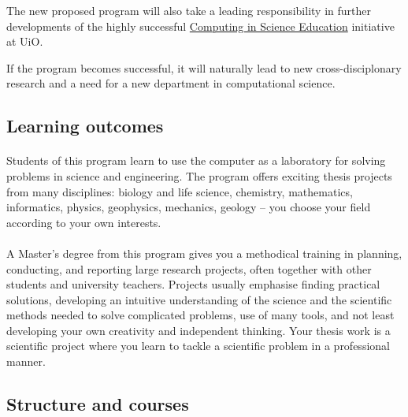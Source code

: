 \documentclass[%
twoside,                 %
final,                   %
10pt]{article}
\begin{document}
The new proposed program will also take a leading responsibility in further
developments of the highly successful \href{{http://www.mn.uio.no/english/about/collaboration/cse/}}{Computing in Science Education} initiative at UiO.

If the program becomes successful, it will naturally lead to
new cross-disciplonary research and a need for a new department
in computational science.




\subsection*{Learning outcomes}

\paragraph{}
Students of this program learn to use the computer as a laboratory for solving problems in science and engineering. The program offers exciting thesis projects from many disciplines: biology and life science, chemistry, mathematics, informatics, physics, geophysics, mechanics, geology  – you choose your  field according to your own interests.




\paragraph{}
A Master’s degree from this program gives you a
methodical training in planning, conducting, and reporting large research
projects, often together with other students and university
teachers. Projects usually emphasise finding practical solutions,
developing an intuitive understanding of the science and the
scientific methods needed to solve complicated problems, use of many
tools, and not least developing your own creativity and independent
thinking. Your thesis work is a scientific project where you learn to
tackle a scientific problem in a professional manner.






\subsection*{Structure and courses}
\end{document}
